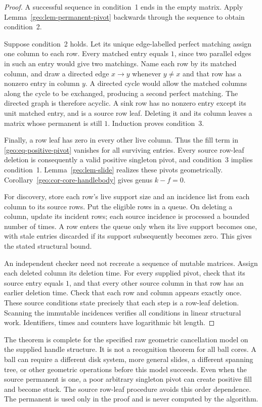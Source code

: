 \begin{proof}
A successful sequence in condition~1 ends in the empty matrix.  Apply
Lemma~\ref{geo:lem-permanent-pivot} backwards through the sequence to obtain
condition~2.

Suppose condition~2 holds.  Let its unique edge-labelled perfect matching
assign one column to each row.  Every matched entry equals $1$, since two
parallel edges in such an entry would give two matchings.  Name each row
by its matched column, and draw a directed edge $x\to y$ whenever $y\ne x$
and that row has a nonzero entry in column $y$.  A directed cycle would
allow the matched columns along the cycle to be exchanged, producing a
second perfect matching.  The directed graph is therefore acyclic.  A
sink row has no nonzero entry except its unit matched entry, and is a
source row leaf.  Deleting it and its column leaves a matrix whose
permanent is still $1$.  Induction proves condition~3.

Finally, a row leaf has zero in every other live column.  Thus the fill
term in \eqref{geo:eq-positive-pivot} vanishes for all surviving entries.
Every source row-leaf deletion is consequently a valid positive singleton
pivot, and condition~3 implies condition~1.  Lemma~\ref{geo:lem-slide}
realizes these pivots geometrically.  Corollary~\ref{geo:cor-core-handlebody}
gives genus $k-f=0$.

For discovery, store each row's live support size and an incidence list
from each column to its source rows.  Put the eligible rows in a queue.
On deleting a column, update its incident rows; each source incidence is
processed a bounded number of times.  A row enters the queue only when its
live support becomes one, with stale entries discarded if its support
subsequently becomes zero.  This gives the stated structural bound.

An independent checker need not recreate a sequence of mutable matrices.
Assign each deleted column its deletion time.  For every supplied pivot,
check that its source entry equals $1$, and that every other source column
in that row has an earlier deletion time.  Check that each row and column
appears exactly once.  These source conditions state precisely that each
step is a row-leaf deletion.  Scanning the immutable incidences verifies
all conditions in linear structural work.  Identifiers, times and counters
have logarithmic bit length.
\end{proof}

\begin{remark}
\label{geo:rem-class-completeness}
The theorem is complete for the specified raw geometric cancellation
model on the supplied handle structure.  It is not a recognition theorem
for all ball cores.  A ball can require a different disk system, more
general slides, a different spanning tree, or other geometric operations
before this model succeeds.  Even when the source permanent is one, a
poor arbitrary singleton pivot can create positive fill and become stuck.
The source row-leaf procedure avoids this order dependence.  The permanent
is used only in the proof and is never computed by the algorithm.
\end{remark}

